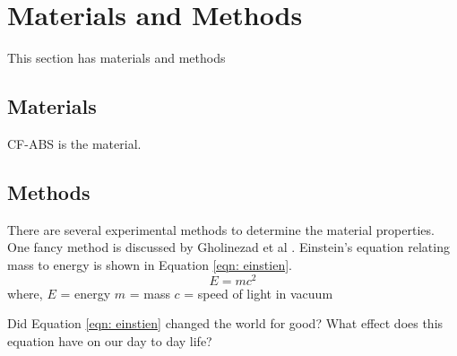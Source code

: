 
\section{Materials and Methods}
This section has materials and methods
\subsection{Materials}
CF-ABS is the material.
\subsection{Methods}
There are several experimental methods to determine the material properties. One fancy method is discussed by Gholinezad et al \cite{gholinezhad2022non}.
Einstein's equation relating mass to energy is shown in Equation \ref{eqn: einstien}.
\begin{equation}
                                                   \label{eqn: einstien}
                                                   E = mc^2
                                                   \end{equation}
\newline
where,\newline
$E$ = energy\newline
$m$ = mass\newline
$c$ = speed of light in vacuum \newline

Did Equation \ref{eqn: einstien} changed the world for good? What effect does this equation have on our day to day life?
